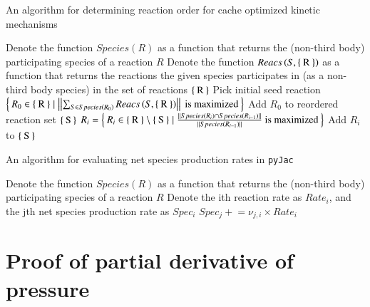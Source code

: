 \documentclass[preprint,12pt]{elsarticle}
\newcommand{\pluseq}{\mathrel{+}=}
\begin{document}
{\begin{algorithm}
\caption{An algorithm for determining reaction order for cache optimized kinetic mechanisms}\label{p:cache_opt_rxn}
\begin{algorithmic}[0]
  \State Denote the function $Species\left(R\right)$ as a function that returns the (non-third body) participating species of a reaction $R$
  \State Denote the function $Reacs\left(S, \Set{\text{R}}\right)$ as a function that returns the reactions the given species participates in (as a non-third body species) in the set of reactions $\Set{\text{R}}$
  \State Pick initial seed reaction $\Set{R_0 \in \Set{\text{R}} \mid \left|\left|\sum_{S\in Species\left(R_0\right)}Reacs\left(S, \Set{\text{R}}\right)\right|\right|\text{ is maximized}}$
  \State Add $R_0$ to reordered reaction set $\Set{\text{S}}$
  		\State $R_i = \Set{R_i \in \Set{\text{R}} \setminus \Set{\text{S}} \mid \frac{\left|\left|Species\left(R_i\right) \cap Species\left(R_{i - 1}\right)\right|\right|}{\left|\left|Species\left(R_{i - 1}\right)\right|\right|}\text{ is maximized}}$
  		\State Add $R_i$ to $\Set{\text{S}}$
  \EndWhile
\end{algorithmic}
\end{algorithm}

\begin{algorithm}
\caption{An algorithm for evaluating net species production rates in \texttt{pyJac}}\label{p:spec_rates_sub}
\begin{algorithmic}[0]
  \State Denote the function $Species\left(R\right)$ as a function that returns the (non-third body) participating species of a reaction $R$
  \State Denote the ith reaction rate as $Rate_i$, and the jth net species production rate as $Spec_i$
  			\State $Spec_j \pluseq \nu_{j, i} \times Rate_i$
  		\EndFor
  \EndFor
\end{algorithmic}
\end{algorithm}

\pagebreak


\appendix


\section{Proof of partial derivative of pressure}
\label{A:pres_deriv}

}
\end{document}

